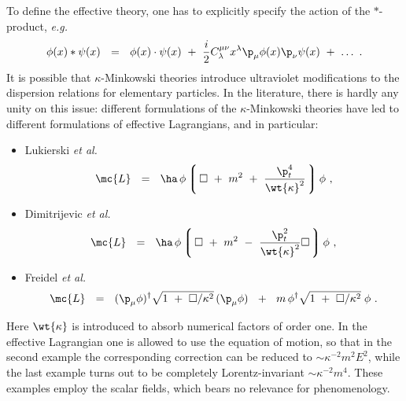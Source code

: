 \documentclass[prl,tightenlines]{revtex4}
\begin{document}
To define the effective theory, one has to explicitly specify the action of the $*$-product, {\it e.g.}
\cite{Dimitrijevic:2003wv}
\begin{eqnarray}
	\phi(x) * \psi(x) ~~=~~ \phi(x) \cdot \psi(x) ~+~ \frac{i}{2} C^{\mu\nu}_\lambda x^\lambda \p_\mu \phi(x) \p_\nu \psi(x)
			~+~ \dots ~.
\end{eqnarray}
It is possible that $ \kappa $-Minkowski theories introduce ultraviolet 
modifications to the dispersion relations for elementary particles. 
In the literature, there is hardly any unity on this issue: 
different formulations of the $ \kappa $-Minkowski theories 
have led to different formulations of effective Lagrangians, and in particular:
\begin{itemize}
\item Lukierski {\it et al.} \cite{Lukierski:1991pn}  \\[-5mm]
\begin{equation}
\label{luk}
	\mc{L} ~~=~~ \ha\, \phi \left\lgroup\,
			\Box ~+~ m^2 ~+~ \frac{\p_t^4}{\wt{\kappa}^2} \,\right\rgroup \phi~,
\end{equation}
\item Dimitrijevic {\it et al.} \cite{Dimitrijevic:2003wv} \\[-5mm]
\begin{equation}
\label{wess}
	\mc{L} ~~=~~ \ha\, \phi \left\lgroup\,  \Box ~+~ m^2 ~-~ \frac{\p_t^2}{\wt{\kappa}^2} \Box 
				\,\right\rgroup \phi~,
\end{equation}
\item Freidel {\it et al.} \cite{Freidel:2006gc} \\[-5mm]
\begin{equation}
\label{freidel}
	\mc{L} ~~=~~ (\p_\mu\phi)^\dag \sqrt{1 ~+~ \Box/\kappa^2}\, (\p_\mu\phi) ~~+~~
		     m\, \phi^\dag \sqrt{1 ~+~ \Box/\kappa^2}\; \phi~.
\end{equation}
\end{itemize} 
Here $ \wt{\kappa} $ is introduced to absorb numerical factors of order one.
In the effective Lagrangian one is allowed to use the equation of motion, so that in the 
second example the corresponding correction can be reduced to $\sim\kappa^{-2}m^2 E^2$, while
the last example turns out to be completely Lorentz-invariant  $\sim\kappa^{-2}m^4$.
These examples employ the scalar fields, which bears no relevance for phenomenology. 
\end{document}
